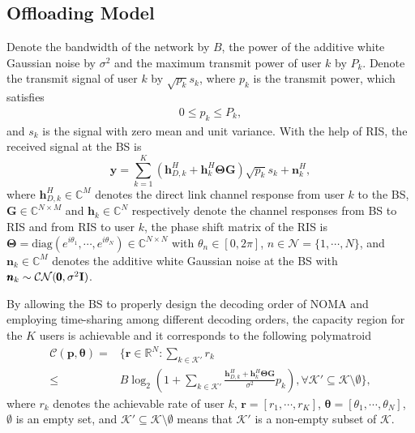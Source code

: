 \documentclass[journal]{IEEEtran}
\begin{document}
\subsection{Offloading Model}
Denote the bandwidth of the network by $B$, the power of the additive white Gaussian noise by $\sigma^2$ and the maximum transmit power of user $k$ by $P_k$.
Denote the transmit signal of user $k$ by $\sqrt{p_k}s_k$, where $p_k$ is the transmit power, which satisfies
\begin{align}
0\leq p_k\leq P_k,
\end{align}
and $s_k$ is the signal with zero mean and unit variance.
With the help of RIS, the received signal at the BS is
{\begin{equation}\label{sys2eq2}
\pmb y=
\sum_{k=1}^K \left(\pmb h_{D,k}^H+\pmb h_{k}^H \pmb \Theta \pmb G\right)  \sqrt{p_k}s_k+\pmb n_k^H ,
\end{equation}
where $\pmb h_{D,k}^H\in\mathbb C^{M}$ denotes the direct link channel response from user $k$ to the BS,} %
$\boldsymbol G\in\mathbb C^{N \times M}$ and $\boldsymbol h_{k}\in\mathbb C^{N}$ respectively denote the channel responses from BS to RIS and from RIS to user $k$,  %
the phase shift matrix of the RIS is $\pmb \Theta =\text{diag} (e^{i\theta_{1}}, \cdots, e^{i\theta_{N}})\in\mathbb C^{N\times  N}$  with $\theta_{n}\in[0,2\pi]$, $n\in\mathcal N=\{1,\cdots,N\}$,
and $\pmb n_k\in\mathbb C^{M}$ denotes the additive white Gaussian
noise at the BS with $\pmb n_k \sim \mathcal C \mathcal N(\pmb 0,  \sigma^2\bf{I} )$.

By allowing the BS to properly design the decoding order of NOMA and employing time-sharing among different decoding orders,
the capacity region for the $K$ users is achievable and it corresponds to the following polymatroid \cite{tse2005fundamentals}
\begin{align}\label{sys1eq6_0}
\mathcal C(\pmb p,  \pmb \theta)=&
\bigg\{
\pmb r \in \mathbb R^{N}:
\sum_{k\in\mathcal K'}r_{k}   \\\nonumber \leq
&B \log_2 \left( 1+ {\sum_{k\in\mathcal K'}\frac{{\pmb h_{D,k}^H+}\pmb h_{k}^H \pmb \Theta \pmb G}{\sigma^2}  {p_k}} \right),
\forall \mathcal K'\subseteq \mathcal K \setminus \emptyset
\bigg\},
\end{align}
where $r_k$ denotes the achievable rate of user $k$,
$\pmb r =[r_1,\cdots, r_K]$,
$\pmb\theta=[\theta_{1},\cdots,\theta_{N}]$,
$\emptyset$ is an empty set, and $\mathcal K'\subseteq \mathcal K\setminus \emptyset$ means that $\mathcal K'$ is a non-empty subset of $\mathcal K$.
\end{document}

